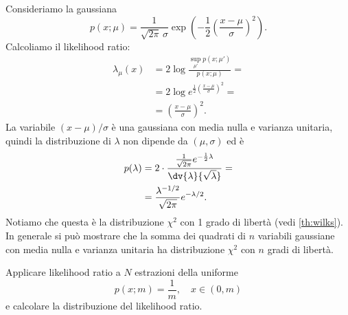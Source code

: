 \begin{example}
	\label{th:lrgauss}
	Consideriamo la gaussiana
	\begin{equation*}
		p(x;\mu)
		= \frac1{\sqrt{2\pi}\,\sigma}
        \exp\left(-\frac12\left(\frac{x-\mu}\sigma\right)^2\right).
	\end{equation*}
	Calcoliamo il likelihood ratio:
	\begin{align*}
		\lambda_\mu(x)
		&= 2\log\frac {\sup\limits_{\mu'} p(x;\mu')} {p(x;\mu)} = \\
		&= 2\log e^{\frac12\left(\frac{x-\mu}\sigma\right)^2} = \\
		&= \left(\frac{x-\mu}\sigma\right)^2.
	\end{align*}
	La variabile $(x-\mu)/\sigma$ è una gaussiana con media nulla e varianza unitaria,
	quindi la distribuzione di $\lambda$ non dipende da $(\mu,\sigma)$ ed è
	\begin{align*}
		p(\lambda)
		&= 2\cdot\frac {\frac1{\sqrt{2\pi}} e^{-\frac12 \lambda}} {\dv{\lambda}{\sqrt\lambda}} = \\
		&= \frac{\lambda^{-1/2}}{\sqrt{2\pi}}e^{-\lambda/2}.
	\end{align*}
	Notiamo che questa è la distribuzione $\chi^2$ con 1 grado di libertà (vedi \autoref{th:wilks}).
	In generale si può mostrare che la somma dei quadrati di $n$ variabili gaussiane
	con media nulla e varianza unitaria
	ha distribuzione $\chi^2$ con $n$ gradi di libertà.
\end{example}

\begin{exercise}
	Applicare likelihood ratio a $N$ estrazioni della uniforme
	\begin{equation*}
		p(x;m)
		= \frac 1m,
		\quad x \in (0,m)
	\end{equation*}
	e calcolare la distribuzione del likelihood ratio.
\end{exercise}

